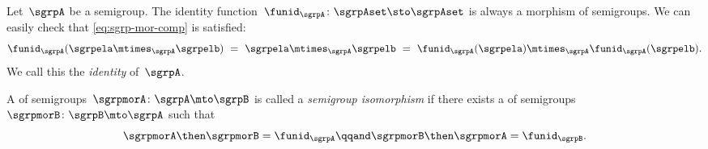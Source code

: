 \begin{ctdefinition}
  \label{def:identity-sgrp-mor}
  Let~$\sgrpA$ be a semigroup.
  The identity function~$\funid_\sgrpA\colon \sgrpAset \sto \sgrpAset$ is always a morphism of semigroups.
  We can easily check that \cref{eq:sgrp-mor-comp} is satisfied:
  \begin{equation}
    \label{eq:identity-sgrp-mor-proof}
    \funid_\sgrpA (\sgrpela \mtimes_{\sgrpA} \sgrpelb) \ = \  \sgrpela \mtimes_{\sgrpA} \sgrpelb
    \ = \
    \funid_\sgrpA (\sgrpela )\mtimes_{\sgrpA}\funid_\sgrpA(\sgrpelb).
  \end{equation}
%
  We call this the \emph{identity \whomo} of~$\sgrpA$.
\end{ctdefinition}
\devel{%
  \begin{forslides}
    \begin{equation}
      \label{eq:identity-sgrp}
      \funid_\sgrpA\colon \sgrpAset \sto \sgrpAset
    \end{equation}
  \end{forslides}
}%


\begin{ctdefinition}
  \label{def:semigroup-iso}
  A \whomo of semigroups~$\sgrpmorA\colon \sgrpA \mto \sgrpB$ is called a \emph{semigroup isomorphism} if there exists a \whomo of semigroups~$\sgrpmorB\colon \sgrpB \mto \sgrpA$ such that
  \begin{equation}
    \label{eq:sgrp-iso-cond}
    \sgrpmorA \then \sgrpmorB = \funid_\sgrpA  \qqand \sgrpmorB \then \sgrpmorA = \funid_\sgrpB.
  \end{equation}
\end{ctdefinition}

